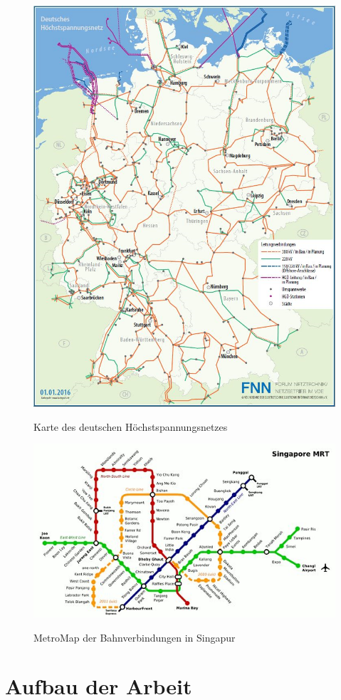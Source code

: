     \begin{figure}[t]
    	\centering
    	{\includegraphics[scale=0.5]{bilder/hochstspannungsnetz}\label{fig_hochstspannungsnetz}
    	}\\
    	\caption[Karte des deutschen Höchstspannungsnetzes]{Karte des deutschen Höchstspannungsnetzes}
    	\label{fig_hochstspannungsnetz2}
    \end{figure}
        \begin{figure}[t]
        	\centering
        	{\includegraphics[scale=0.5]{bilder/metromapsinga}\label{fig_metromapsinga}
        	}\\
        	\caption[MetroMap der Bahnverbindungen in Singapur]{MetroMap der Bahnverbindungen in Singapur}
        	\label{fig_metromapsinga2}
        \end{figure}

\section{Aufbau der Arbeit}
\label{Aufbau_der_Arbeit}
%

